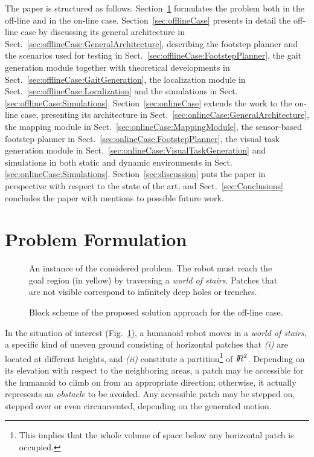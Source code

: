 The paper is structured as follows. Section~\ref{sec:Formulation} formulates the problem both in the off-line and in the on-line case. Section~\ref{sec:offlineCase} presents in detail the off-line case by discussing its general architecture in Sect.~\ref{sec:offlineCase:GeneralArchitecture}, describing the footstep planner and the scenarios used for testing in Sect.~\ref{sec:offlineCase:FootstepPlanner}, the gait generation module together with theoretical developments in Sect.~\ref{sec:offlineCase:GaitGeneration}, the localization module in Sect.~\ref{sec:offlineCase:Localization} and the simulations in Sect. \ref{sec:offlineCase:Simulations}. Section~\ref{sec:onlineCase} extends the work to the on-line case, presenting its architecture in Sect.~\ref{sec:onlineCase:GeneralArchitecture}, the mapping module in Sect.~\ref{sec:onlineCase:MappingModule}, the sensor-based footstep planner in Sect.~\ref{sec:onlineCase:FootstepPlanner}, the visual task generation module in Sect.~\ref{sec:onlineCase:VisualTaskGeneration} and simulations in both static and dynamic environments in Sect. \ref{sec:onlineCase:Simulations}. Section~\ref{sec:discussion} puts the paper in perspective with respect to the state of the art, and Sect.~\ref{sec:Conclusions} concludes the paper with mentions to possible future work.

	
\section{Problem Formulation}
\label{sec:Formulation}


\begin{figure}
\WoSScenario
\caption{An instance of the considered problem. The robot must reach the goal region (in yellow) by traversing a {\em world of stairs}. Patches that are not visible correspond to infinitely deep holes or trenches.}
\label{fig:WoSScenario}
\end{figure}

\begin{figure}[t]
\BlockSchemeOffline
\caption{Block scheme of the proposed solution approach for the off-line case.}
\label{fig:blockScheme1}
\end{figure}

In the situation of interest (Fig.~\ref{fig:WoSScenario}), a humanoid robot moves in a {\em world of stairs}, a specific kind of uneven ground consisting of horizontal patches that {\em (i)} are located at different heights, and {\em (ii)} constitute a partition\footnote{This implies that the whole volume of space below any horizontal patch is occupied.} of ${I\!\!R}^2$. 
Depending on its elevation with respect to the neighboring areas, a patch may be accessible for the humanoid to climb on from an appropriate direction; otherwise, it actually represents an {\em obstacle} to be avoided. Any accessible patch may be stepped on, stepped over or even circumvented, depending on the generated motion.  

